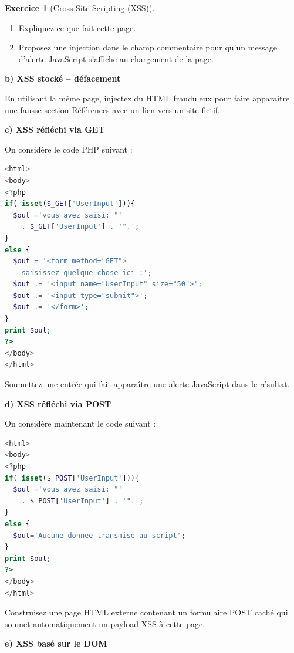 \documentclass[a4paper,11pt]{article}
\theoremstyle{plain}
\theoremstyle{definition}
\newtheorem{exercice}{Exercice}
\begin{document}
\begin{exercice}[Cross-Site Scripting (XSS)]
\begin{enumerate}
    \item Expliquez ce que fait cette page.
    \item Proposez une injection dans le champ commentaire pour qu'un message d'alerte JavaScript s'affiche au chargement de la page.
\end{enumerate}

\medskip

\textbf{b) XSS stocké -- défacement}

\medskip

En utilisant la même page, injectez du HTML frauduleux pour faire apparaître une fausse section \og Références \fg{} avec un lien vers un site fictif.

\medskip

\textbf{c) XSS réfléchi via GET}

\medskip

On considère le code PHP suivant :

\begin{lstlisting}[language=PHP]
<html>
<body>
<?php
if( isset($_GET['UserInput'])){
  $out ='vous avez saisi: "'
    . $_GET['UserInput'] . '".';
}
else {
  $out = '<form method="GET">
    saisissez quelque chose ici :';
  $out .= '<input name="UserInput" size="50">';
  $out .= '<input type="submit">';
  $out .= '</form>';
}
print $out;
?>
</body>
</html>
\end{lstlisting}

Soumettez une entrée qui fait apparaître une alerte JavaScript dans le résultat.

\medskip

\textbf{d) XSS réfléchi via POST}

\medskip

On considère maintenant le code suivant :

\begin{lstlisting}[language=PHP]
<html>
<body>
<?php
if( isset($_POST['UserInput'])){
  $out ='vous avez saisi: "'
    . $_POST['UserInput'] . '".';
}
else {
  $out='Aucune donnee transmise au script';
}
print $out;
?>
</body>
</html>
\end{lstlisting}

Construisez une page HTML externe contenant un formulaire POST caché qui soumet automatiquement un payload XSS à cette page.

\medskip

\textbf{e) XSS basé sur le DOM}

\medskip


\end{exercice}
\end{document}
